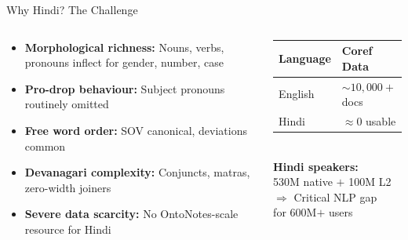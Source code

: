 \documentclass[aspectratio=169]{beamer}
\begin{document}
\begin{frame}{Why Hindi? The Challenge}
  \begin{columns}[T]
      \begin{tcolorbox}[wbox={Hindi-Specific Challenges}]
        \small
        \begin{itemize}\setlength\itemsep{4pt}
          \item \textbf{Morphological richness:} Nouns, verbs, pronouns
                inflect for gender, number, case
          \item \textbf{Pro-drop behaviour:} Subject pronouns routinely omitted
          \item \textbf{Free word order:} SOV canonical, deviations common
          \item \textbf{Devanagari complexity:} Conjuncts, matras,
                zero-width joiners
          \item \textbf{Severe data scarcity:} No OntoNotes-scale resource
                for Hindi
        \end{itemize}
      \end{tcolorbox}

      \begin{tcolorbox}[rbox={The Scale of the Gap}]
        \small
        \renewcommand{\arraystretch}{1.35}
        \begin{tabular}{@{}ll@{}}
          \toprule
          \textbf{Language} & \textbf{Coref Data}\\
          \midrule
          English & ${\sim}10{,}000+$ docs\\
          Hindi   & ${\approx}0$ usable\\
          \bottomrule
        \end{tabular}\\[8pt]
        \textbf{Hindi speakers:}\\
        530M native $+$ 100M L2\\[5pt]
        \textcolor{red!70!black}{$\Rightarrow$ Critical NLP gap\\
        for 600M$+$ users}
      \end{tcolorbox}
  \end{columns}
\end{frame}
\end{document}
